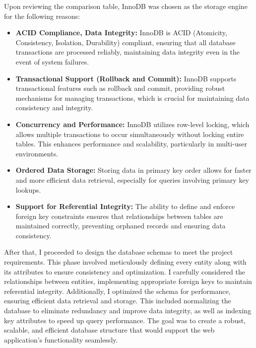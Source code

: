     Upon reviewing the comparison table, InnoDB was chosen as the storage engine for the following reasons:

    \begin{itemize}
        \item \textbf{ACID Compliance, Data Integrity:} InnoDB is ACID (Atomicity, Consistency, Isolation, Durability) compliant, ensuring that all database transactions are processed reliably, maintaining data integrity even in the event of system failures.

        \item \textbf{Transactional Support (Rollback and Commit):} InnoDB supports transactional features such as rollback and commit, providing robust mechanisms for managing transactions, which is crucial for maintaining data consistency and integrity.

        \item \textbf{Concurrency and Performance:} InnoDB utilizes row-level locking, which allows multiple transactions to occur simultaneously without locking entire tables. This enhances performance and scalability, particularly in multi-user environments.

        \item \textbf{Ordered Data Storage:} Storing data in primary key order allows for faster and more efficient data retrieval, especially for queries involving primary key lookups.


        \item \textbf{Support for Referential Integrity:} The ability to define and enforce foreign key constraints ensures that relationships between tables are maintained correctly, preventing orphaned records and ensuring data consistency. 
    \end{itemize}


    After that, I proceeded to design the database schemas to meet the project requirements. This phase involved meticulously defining every entity along with its attributes to ensure consistency and optimization. I carefully considered the relationships between entities, implementing appropriate foreign keys to maintain referential integrity. Additionally, I optimized the schema for performance, ensuring efficient data retrieval and storage. This included normalizing the database to eliminate redundancy and improve data integrity, as well as indexing key attributes to speed up query performance. The goal was to create a robust, scalable, and efficient database structure that would support the web application's functionality seamlessly. 
    
